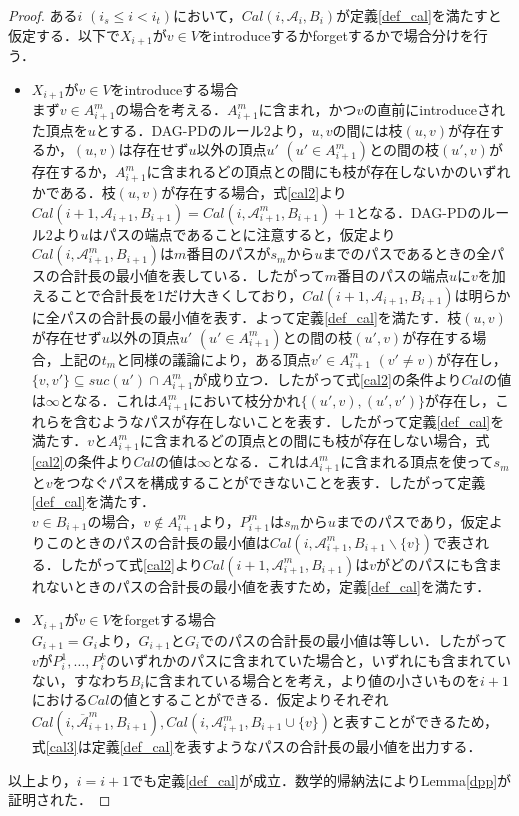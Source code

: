 \documentclass[master]{kuisthesis}		%
\theoremstyle{plain}
\theoremstyle{definition}
\begin{document}
\begin{proof}
    ある$i$ $(i_s \leq i < i_t)$において，$Cal(i, \mathscr{A}_i, B_i)$が定義\ref{def_cal}を満たすと仮定する．以下で$X_{i+1}$が$v \in V$をintroduceするかforgetするかで場合分けを行う．
    \begin{itemize}
        \item $X_{i+1}$が$v \in V$をintroduceする場合 \\
        まず$v \in A^m_{i+1}$の場合を考える．$A^m_{i+1}$に含まれ，かつ$v$の直前にintroduceされた頂点を$u$とする．DAG-PDのルール2より，$u, v$の間には枝$(u, v)$が存在するか，$(u, v)$は存在せず$u$以外の頂点$u'$ $(u' \in A^m_{i+1})$との間の枝$(u', v)$が存在するか，$A^m_{i+1}$に含まれるどの頂点との間にも枝が存在しないかのいずれかである．枝$(u, v)$が存在する場合，式\ref{cal2}より$Cal(i+1, \mathscr{A}_{i+1}, B_{i+1}) = Cal(i, \mathscr{A}^m_{i+1}, B_{i+1})+1$となる．DAG-PDのルール2より$u$はパスの端点であることに注意すると，仮定より$Cal(i, \mathscr{A}^m_{i+1}, B_{i+1})$は$m$番目のパスが$s_m$から$u$までのパスであるときの全パスの合計長の最小値を表している．したがって$m$番目のパスの端点$u$に$v$を加えることで合計長を1だけ大きくしており，$Cal(i+1, \mathscr{A}_{i+1}, B_{i+1})$は明らかに全パスの合計長の最小値を表す．よって定義\ref{def_cal}を満たす．枝$(u, v)$が存在せず$u$以外の頂点$u'$ $(u' \in A^m_{i+1})$との間の枝$(u', v)$が存在する場合，上記の$t_m$と同様の議論により，ある頂点$v' \in A^m_{i+1}$ $(v' \neq v)$が存在し，$\{v, v'\} \subseteq suc(u') \cap A^m_{i+1}$が成り立つ．したがって式\ref{cal2}の条件より$Cal$の値は$\infty$となる．これは$A^m_{i+1}$において枝分かれ$\{(u', v), (u', v')\}$が存在し，これらを含むようなパスが存在しないことを表す．したがって定義\ref{def_cal}を満たす．$v$と$A^m_{i+1}$に含まれるどの頂点との間にも枝が存在しない場合，式\ref{cal2}の条件より$Cal$の値は$\infty$となる．これは$A^m_{i+1}$に含まれる頂点を使って$s_m$と$v$をつなぐパスを構成することができないことを表す．したがって定義\ref{def_cal}を満たす．\\
        $v \in B_{i+1}$の場合，$v \notin A^m_{i+1}$より，$P^m_{i+1}$は$s_m$から$u$までのパスであり，仮定よりこのときのパスの合計長の最小値は$Cal(i, \mathscr{A}^m_{i+1}, B_{i+1} \backslash \{v\})$で表される．したがって式\ref{cal2}より$Cal(i+1, \mathscr{A}^m_{i+1}, B_{i+1})$は$v$がどのパスにも含まれないときのパスの合計長の最小値を表すため，定義\ref{def_cal}を満たす．\\
        
        \item $X_{i+1}$が$v \in V$をforgetする場合 \\
        $G_{i+1} = G_i$より，$G_{i+1}$と$G_i$でのパスの合計長の最小値は等しい．したがって$v$が$P^1_i, \dots , P^k_i$のいずれかのパスに含まれていた場合と，いずれにも含まれていない，すなわち$B_i$に含まれている場合とを考え，より値の小さいものを$i+1$における$Cal$の値とすることができる．仮定よりそれぞれ$Cal(i, \mathscr{\overline{A}}^m_{i+1}, B_{i+1}),Cal(i, \mathscr{A}^m_{i+1}, B_{i+1} \cup \{v\})$と表すことができるため，式\ref{cal3}は定義\ref{def_cal}を表すようなパスの合計長の最小値を出力する．
    \end{itemize}
    以上より，$i = i+1$でも定義\ref{def_cal}が成立．数学的帰納法によりLemma\ref{dpp}が証明された．
\end{proof}
\end{document}
